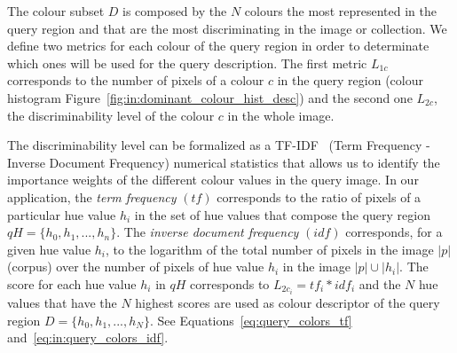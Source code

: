 




The colour subset $D$ is composed by the $N$ colours the most represented in the query region and that are the most discriminating in the image or collection.
We define two metrics for each colour of the query region in order to determinate which ones will be used for the query description.
The first metric $L_{1c}$ corresponds to the number of pixels of a colour $c$ in the query region (colour histogram Figure~\ref{fig:in:dominant_colour_hist_desc}) and the second one $L_{2c}$, the discriminability level of the colour $c$ in the whole image.

The discriminability level can be formalized as a TF-IDF~\cite{salton1986introduction} (Term Frequency - Inverse Document Frequency) numerical statistics that allows us to identify the importance weights of the different colour values in the query image.
In our application, the {\it term frequency} $(tf)$ corresponds to the ratio of pixels of a particular hue value $h_i$ in the set of hue values that compose the query region $qH=\{h_0, h_1,...,h_n\}$.
The {\it inverse document frequency} $(idf)$ corresponds, for a given hue value $h_i$, to the logarithm of the total number of pixels in the image $|p|$ (corpus) over the number of pixels of hue value $h_i$ in the image $|p| \cup |h_i|$.
The score for each hue value $h_i$ in $qH$ corresponds to $L_{2c_i} = tf_i * idf_i$ and the $N$ hue values that have the $N$ highest scores are used as colour descriptor of the query region $D=\{h_0,h_1,...,h_N\}$.
See Equations~\ref{eq:query_colors_tf} and~\ref{eq:in:query_colors_idf}.%

